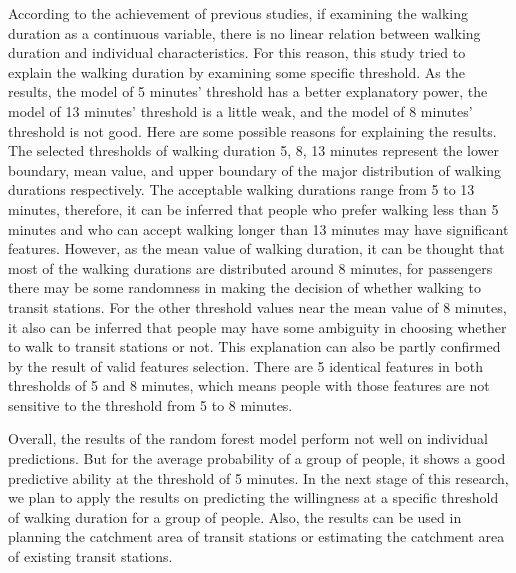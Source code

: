 \documentclass[Journal,letterpaper]{ascelike-new}
\begin{document}
%
According to the achievement of previous studies, if examining the walking duration as a continuous variable, there is no linear relation between walking duration and individual characteristics. For this reason, this study tried to explain the walking duration by examining some specific threshold. As the results, the model of 5 minutes’ threshold has a better explanatory power, the model of 13 minutes' threshold is a little weak, and the model of 8 minutes' threshold is not good. Here are some possible reasons for explaining the results. The selected thresholds of walking duration 5, 8, 13 minutes represent the lower boundary, mean value, and upper boundary of the major distribution of walking durations respectively. The acceptable walking durations range from 5 to 13 minutes, therefore, it can be inferred that people who prefer walking less than 5 minutes and who can accept walking longer than 13 minutes may have significant features. However, as the mean value of walking duration, it can be thought that most of the walking durations are distributed around 8 minutes, for passengers there may be some randomness in making the decision of whether walking to transit stations. For the other threshold values near the mean value of 8 minutes, it also can be inferred that people may have some ambiguity in choosing whether to walk to transit stations or not. This explanation can also be partly confirmed by the result of valid features selection. There are 5 identical features in both thresholds of 5 and 8 minutes, which means people with those features are not sensitive to the threshold from 5 to 8 minutes.

%
Overall, the results of the random forest model perform not well on individual predictions. But for the average probability of a group of people, it shows a good predictive ability at the threshold of 5 minutes. In the next stage of this research, we plan to apply the results on predicting the willingness at a specific threshold of walking duration for a group of people. Also, the results can be used in planning the catchment area of transit stations or estimating the catchment area of existing transit stations.


\end{document}
